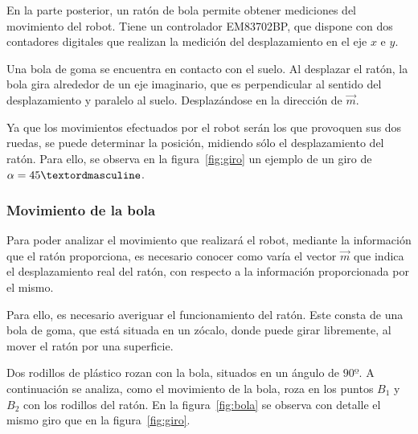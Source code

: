 \documentclass[10pt,a4paper,hidelinks,twocolumn]{article}
\begin{document}
En la parte posterior, un ratón de bola permite obtener mediciones del movimiento del
robot. Tiene un controlador EM83702BP, que dispone con dos contadores digitales que
realizan la medición del desplazamiento en el eje $x$ e $y$.

Una bola de goma se encuentra en contacto con el suelo. Al desplazar el ratón, 
la bola gira alrededor de un eje imaginario, que es perpendicular al sentido del
desplazamiento y paralelo al suelo. Desplazándose en la dirección de $\vec{m}$.

Ya que los movimientos efectuados por el robot serán los que provoquen sus dos ruedas,
se puede determinar la posición, midiendo sólo el desplazamiento del ratón. Para ello,
se observa en la figura~\ref{fig:giro} un ejemplo de un giro de $\alpha = \RobotAngleº$.


\subsubsection{Movimiento de la bola}
Para poder analizar el movimiento que realizará el robot, mediante la 
información que el ratón proporciona, es necesario conocer como varía el vector 
$\vec{m}$ que indica el desplazamiento real del ratón, con respecto a la 
información proporcionada por el mismo.

Para ello, es necesario averiguar el funcionamiento del ratón. Este consta de 
una bola de goma, que está situada en un zócalo, donde puede girar libremente, 
al mover el ratón por una superficie.

Dos rodillos de plástico rozan con la bola, situados en un ángulo de $90º$. A 
continuación se analiza, como el movimiento de la bola, roza en los puntos $B_1$ 
y $B_2$ con los rodillos del ratón. En la figura~\ref{fig:bola} se observa con 
detalle el mismo giro que en la figura~\ref{fig:giro}.

\end{document}
